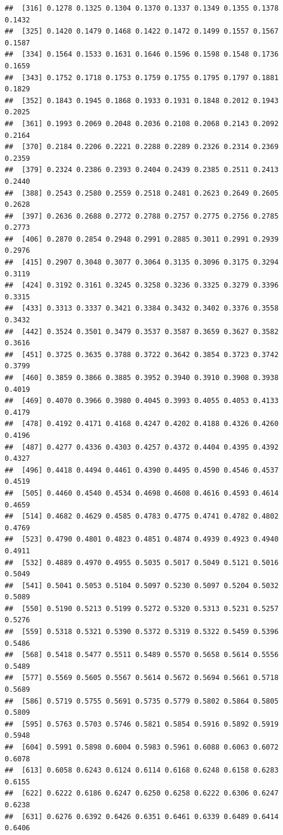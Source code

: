 \documentclass[]{article}
\begin{document}
\begin{verbatim}
##  [316] 0.1278 0.1325 0.1304 0.1370 0.1337 0.1349 0.1355 0.1378 0.1432
##  [325] 0.1420 0.1479 0.1468 0.1422 0.1472 0.1499 0.1557 0.1567 0.1587
##  [334] 0.1564 0.1533 0.1631 0.1646 0.1596 0.1598 0.1548 0.1736 0.1659
##  [343] 0.1752 0.1718 0.1753 0.1759 0.1755 0.1795 0.1797 0.1881 0.1829
##  [352] 0.1843 0.1945 0.1868 0.1933 0.1931 0.1848 0.2012 0.1943 0.2025
##  [361] 0.1993 0.2069 0.2048 0.2036 0.2108 0.2068 0.2143 0.2092 0.2164
##  [370] 0.2184 0.2206 0.2221 0.2288 0.2289 0.2326 0.2314 0.2369 0.2359
##  [379] 0.2324 0.2386 0.2393 0.2404 0.2439 0.2385 0.2511 0.2413 0.2440
##  [388] 0.2543 0.2580 0.2559 0.2518 0.2481 0.2623 0.2649 0.2605 0.2628
##  [397] 0.2636 0.2688 0.2772 0.2788 0.2757 0.2775 0.2756 0.2785 0.2773
##  [406] 0.2870 0.2854 0.2948 0.2991 0.2885 0.3011 0.2991 0.2939 0.2976
##  [415] 0.2907 0.3048 0.3077 0.3064 0.3135 0.3096 0.3175 0.3294 0.3119
##  [424] 0.3192 0.3161 0.3245 0.3258 0.3236 0.3325 0.3279 0.3396 0.3315
##  [433] 0.3313 0.3337 0.3421 0.3384 0.3432 0.3402 0.3376 0.3558 0.3432
##  [442] 0.3524 0.3501 0.3479 0.3537 0.3587 0.3659 0.3627 0.3582 0.3616
##  [451] 0.3725 0.3635 0.3788 0.3722 0.3642 0.3854 0.3723 0.3742 0.3799
##  [460] 0.3859 0.3866 0.3885 0.3952 0.3940 0.3910 0.3908 0.3938 0.4019
##  [469] 0.4070 0.3966 0.3980 0.4045 0.3993 0.4055 0.4053 0.4133 0.4179
##  [478] 0.4192 0.4171 0.4168 0.4247 0.4202 0.4188 0.4326 0.4260 0.4196
##  [487] 0.4277 0.4336 0.4303 0.4257 0.4372 0.4404 0.4395 0.4392 0.4327
##  [496] 0.4418 0.4494 0.4461 0.4390 0.4495 0.4590 0.4546 0.4537 0.4519
##  [505] 0.4460 0.4540 0.4534 0.4698 0.4608 0.4616 0.4593 0.4614 0.4659
##  [514] 0.4682 0.4629 0.4585 0.4783 0.4775 0.4741 0.4782 0.4802 0.4769
##  [523] 0.4790 0.4801 0.4823 0.4851 0.4874 0.4939 0.4923 0.4940 0.4911
##  [532] 0.4889 0.4970 0.4955 0.5035 0.5017 0.5049 0.5121 0.5016 0.5049
##  [541] 0.5041 0.5053 0.5104 0.5097 0.5230 0.5097 0.5204 0.5032 0.5089
##  [550] 0.5190 0.5213 0.5199 0.5272 0.5320 0.5313 0.5231 0.5257 0.5276
##  [559] 0.5318 0.5321 0.5390 0.5372 0.5319 0.5322 0.5459 0.5396 0.5486
##  [568] 0.5418 0.5477 0.5511 0.5489 0.5570 0.5658 0.5614 0.5556 0.5489
##  [577] 0.5569 0.5605 0.5567 0.5614 0.5672 0.5694 0.5661 0.5718 0.5689
##  [586] 0.5719 0.5755 0.5691 0.5735 0.5779 0.5802 0.5864 0.5805 0.5809
##  [595] 0.5763 0.5703 0.5746 0.5821 0.5854 0.5916 0.5892 0.5919 0.5948
##  [604] 0.5991 0.5898 0.6004 0.5983 0.5961 0.6088 0.6063 0.6072 0.6078
##  [613] 0.6058 0.6243 0.6124 0.6114 0.6168 0.6248 0.6158 0.6283 0.6155
##  [622] 0.6222 0.6186 0.6247 0.6250 0.6258 0.6222 0.6306 0.6247 0.6238
##  [631] 0.6276 0.6392 0.6426 0.6351 0.6461 0.6339 0.6489 0.6414 0.6406

\end{verbatim}
\end{document}
